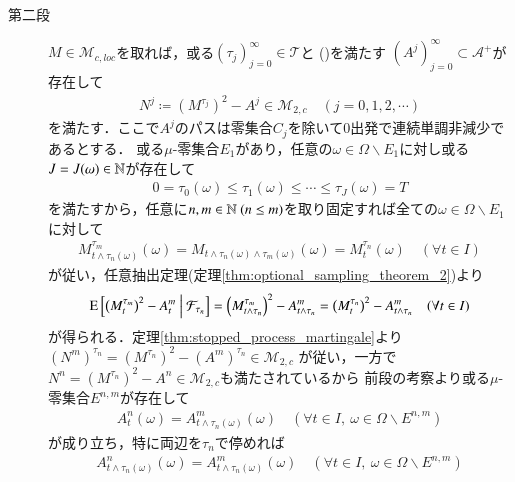 \begin{prf}
\begin{description}
			\item[第二段]
				$M \in \mathcal{M}_{c,loc}$を取れば，或る$(\tau_j)_{j=0}^{\infty} \in \mathcal{T}$と
				()を満たす
				$\left( A^j \right)_{j=0}^{\infty} \subset \mathcal{A}^+$が存在して
				\begin{align}
					N^j \coloneqq \left( M^{\tau_j} \right)^2 - A^j \in \mathcal{M}_{2,c}
					\quad (j=0,1,2,\cdots)
				\end{align}
				を満たす．ここで$A^j$のパスは零集合$C_j$を除いて0出発で連続単調非減少であるとする．
				或る$\mu$-零集合$E_1$があり，任意の$\omega \in \Omega \backslash E_1$に対し或る$J = J(\omega) \in \mathbb{N}$が存在して
				\begin{align}
					0 = \tau_0(\omega) \leq \tau_1(\omega) \leq \cdots \leq \tau_J(\omega) = T
					\label{eq:thm_existence_of_quadratic_variation_1}
				\end{align}
				を満たすから，任意に$n,m \in \mathbb{N}\ (n \leq m)$を取り固定すれば全ての$\omega \in \Omega \backslash E_1$に対して
				\begin{align}
					M_{t \wedge \tau_n(\omega)}^{\tau_m}(\omega) = M_{t \wedge \tau_n(\omega) \wedge \tau_m(\omega)}(\omega) = M_t^{\tau_n}(\omega) 
					\quad (\forall t \in I)
				\end{align}
				が従い，任意抽出定理(定理\ref{thm:optional_sampling_theorem_2})より
				\begin{align}
					\operatorname{E} \left[ \left(M_t^{\tau_m}\right)^2 - A_t^m \ \middle|\ \mathcal{F}_{\tau_n} \right] 
					= \left(M_{t \wedge \tau_n}^{\tau_m}\right)^2 - A_{t \wedge \tau_n}^m 
					= \left(M_t^{\tau_n}\right)^2 - A_{t \wedge \tau_n}^m
					\quad (\forall t \in I)
				\end{align}
				が得られる．定理\ref{thm:stopped_process_martingale}より
				$\left(N^m \right)^{\tau_n} = \left(M^{\tau_n}\right)^2 - (A^m)^{\tau_n} \in \mathcal{M}_{2,c}$
				が従い，一方で$N^n = \left(M^{\tau_n}\right)^2 - A^n \in \mathcal{M}_{2,c}$も満たされているから
				前段の考察より或る$\mu$-零集合$E^{n,m}$が存在して
				\begin{align}
					A_t^n(\omega) = A_{t \wedge \tau_n(\omega)}^m(\omega) \quad (\forall t \in I,\ \omega \in \Omega \backslash E^{n,m})
				\end{align}
				が成り立ち，特に両辺を$\tau_n$で停めれば
				\begin{align}
					A_{t \wedge \tau_n(\omega)}^n(\omega) = A_{t \wedge \tau_n(\omega)}^m(\omega) \quad (\forall t \in I,\ \omega \in \Omega \backslash E^{n,m})
				\end{align}

\end{description}
\end{prf}
